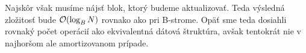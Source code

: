 Najskôr však musíme nájsť blok, ktorý budeme aktualizovať. Teda výsledná zložitosť bude $\mathcal{O}(\log_B{N})$ rovnako ako pri \aware B-strome. Opäť sme teda dosiahli rovnaký počet operácií ako ekvivalentná \aware dátová štruktúra, avšak tentokrát nie v najhoršom ale  amortizovanom prípade.






